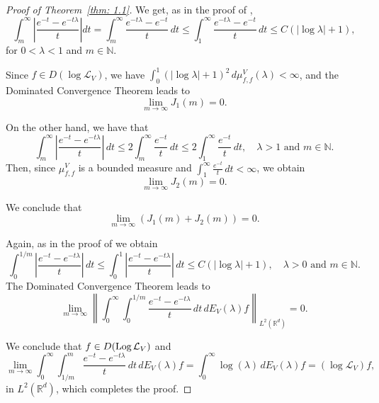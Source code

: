 \documentclass[10pt, a4paper, reqno]{amsart}
\theoremstyle{definition}
\theoremstyle{remark}
\DeclareMathOperator{\Log}{\textup{Log}}
\numberwithin{equation}{section}
\begin{document}
\begin{proof}[Proof of Theorem~\ref{thm: 1.1}]
We get, as in the proof of \cite[Theorem~2.12]{Ch-manifolds},
\begin{equation*}
    \int_m^\infty \left| \frac{e^{-t} - e^{-t\lambda}}{t} \right| dt = \int_m^\infty \frac{e^{-t\lambda} - e^{-t}}{t} \, dt \leq \int_1^\infty \frac{e^{-t\lambda} - e^{-t}}{t} \, dt \leq C(|\log\lambda| + 1),
\end{equation*}
for $0 < \lambda < 1$ and $m \in \mathbb{N}$.



Since $f \in D(\log \mathcal{L}_V)$, we have $\displaystyle \int_0^1 (|\log\lambda| + 1)^2 \, d\mu_{f,f}^V(\lambda) < \infty$, and the Dominated Convergence Theorem leads to
\[
\lim_{m \rightarrow \infty} J_1(m) = 0.
\]

On the other hand, we have that
\[
\int_m^\infty \left| \frac{e^{-t} - e^{-t\lambda}}{t} \right| \, dt \leq 2 \int_m^\infty \frac{e^{-t}}{t} \, dt \leq 2 \int_1^\infty \frac{e^{-t}}{t} \, dt, \quad \lambda > 1 \text{ and } m \in \mathbb{N}.
\]
Then, since $\mu_{f,f}^V$ is a bounded measure and $\int_1^\infty \frac{e^{-t}}{t} \, dt < \infty$, we obtain
\[
\lim_{m \rightarrow \infty} J_2(m) = 0.
\]

We conclude that 
\[ 
\lim_{m \rightarrow \infty} \left( J_1(m) + J_2(m) \right) = 0.
\]


Again, as in the proof of \cite[Theorem~2.12]{Ch-manifolds} we obtain
\[
\int_0^{1/m} \left| \frac{e^{-t} - e^{-t\lambda}}{t} \right| \, dt \leq \int_0^1 \left| \frac{e^{-t} - e^{-t\lambda}}{t} \right| \, dt \leq C(|\log \lambda| + 1), \quad \lambda > 0 \text{ and } m \in \mathbb{N}. 
\]
The Dominated Convergence Theorem leads to 
\[ 
\lim_{m \rightarrow \infty} \left\| \int_0^\infty \int_0^{1/m} \frac{e^{-t} - e^{-t\lambda}}{t} \, dt \, dE_V(\lambda) f \right\|_{L^2(\mathbb{R}^d)} = 0.
\]

We conclude that $f \in D(\Log \mathcal{L}_V)$ and 
\[ 
\lim_{m \rightarrow \infty} \int_0^\infty \int_{1/m}^m \frac{e^{-t} - e^{-t\lambda}}{t} \, dt \, dE_V(\lambda) f = \int_0^\infty \log(\lambda) \, dE_V(\lambda) f = (\log \mathcal{L}_V) f,
\]
in $L^2(\mathbb{R}^d)$, which completes the proof.

\end{proof}
\end{document}
